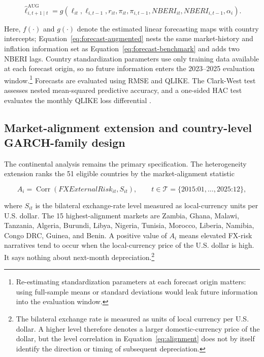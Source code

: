 \documentclass[11pt]{article}
\begin{document}
\begin{equation}
\label{eq:forecast-augmented}
\widehat{\ell}^{\mathrm{AUG}}_{i,t+1\mid t}
=g\!\left(\ell_{it},\ell_{i,t-1},r_{it},\pi_{it},\pi_{i,t-1},
NBERI_{it},NBERI_{i,t-1},\alpha_i\right).
\end{equation}

Here, $f(\cdot)$ and $g(\cdot)$ denote the estimated linear forecasting maps with country intercepts; Equation~\eqref{eq:forecast-augmented} nests the same market-history and inflation information set as Equation~\eqref{eq:forecast-benchmark} and adds two NBERI lags. Country standardization parameters use only training data available at each forecast origin, so no future information enters the 2023--2025 evaluation window.\footnote{Re-estimating standardization parameters at each forecast origin matters: using full-sample means or standard deviations would leak future information into the evaluation window.} Forecasts are evaluated using RMSE and QLIKE. The Clark-West test assesses nested mean-squared predictive accuracy, and a one-sided HAC test evaluates the monthly QLIKE loss differential \citep{clark2007,patton2011}.

\subsection{Market-alignment extension and country-level
GARCH-family
design}\label{market-alignment-extension-and-country-level-garch-family-design}

The continental analysis remains the primary specification. The heterogeneity extension ranks the 51 eligible countries by the market-alignment statistic

\begin{equation}
\label{eq:alignment}
A_i
=\operatorname{Corr}\!\left(FXExternalRisk_{it},S_{it}\right),
\qquad
t\in\mathcal{T}=\{\text{2015:01},\ldots,\text{2025:12}\},
\end{equation}

where $S_{it}$ is the bilateral exchange-rate level measured as local-currency units per U.S. dollar. The 15 highest-alignment markets are Zambia, Ghana, Malawi, Tanzania, Algeria, Burundi, Libya, Nigeria, Tunisia, Morocco, Liberia, Namibia, Congo DRC, Guinea, and Benin. A positive value of $A_i$ means elevated FX-risk narratives tend to occur when the local-currency price of the U.S. dollar is high. It says nothing about next-month depreciation.\footnote{The bilateral exchange rate is measured as units of local currency per U.S. dollar. A higher level therefore denotes a larger domestic-currency price of the dollar, but the level correlation in Equation~\eqref{eq:alignment} does not by itself identify the direction or timing of subsequent depreciation.}
\end{document}
